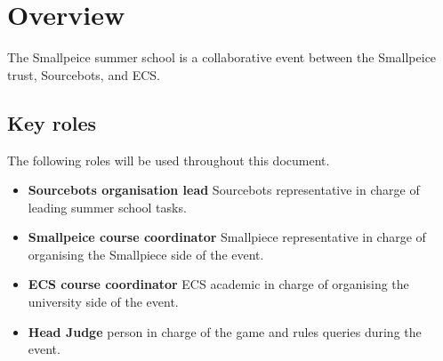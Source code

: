\section{Overview}

The Smallpeice summer school is a collaborative event between the Smallpeice trust, Sourcebots, and ECS.


\subsection{Key roles}

The following roles will be used throughout this document.

\begin{itemize}
    \item \textbf{Sourcebots organisation lead} Sourcebots representative in charge of leading summer school tasks.
    \item \textbf{Smallpeice course coordinator} Smallpiece representative in charge of organising the Smallpiece side of the event.
    \item \textbf{ECS course coordinator} ECS academic in charge of organising the university side of the event.
    \item \textbf{Head Judge} person in charge of the game and rules queries during the event.
\end{itemize}
